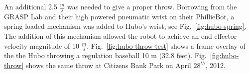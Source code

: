 
An additional 2.5 $\frac{m}{s}$ was needed to give a proper throw.  
Borrowing from the GRASP Lab and their high powered pneumatic wrist on their PhillieBot, a spring loaded mechanism was added to Hubo's wrist, see Fig.~\ref{fig:hubo-spring}.
The addition of this mechanism allowed the robot to achieve an end-effector velocity magnitude of 10 $\frac{m}{s}$.
Fig.~\ref{fig:hubo-throw-test} shows a frame overlay of the the Hubo throwing a regulation baseball 10 m (32.8 feet).
Fig.~\ref{fig:hubo-throw} shows the same throw at Citizens Bank Park on April $28^{th}$, 2012.




